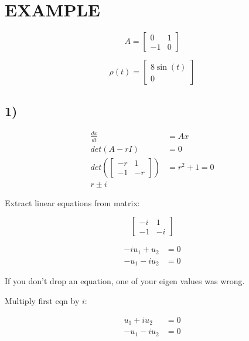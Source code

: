 \documentclass[twocolumn,draft]{article}
\begin{document}
  \section*{EXAMPLE}
  
  \begin{equation}
  	A = \begin{bmatrix}
	0 & 1 \\
	-1 & 0
  	\end{bmatrix}
  \end{equation}
  
  \begin{equation}
  	\rho(t) = \begin{bmatrix}
	8\sin{(t)} \\
	0
  	\end{bmatrix}
  \end{equation}
  
  \subsection*{1)}
  
  \begin{align*}
  	\frac{dx}{dt} &= Ax \\
	det(A-rI) &= 0 \\
	det(\begin{bmatrix}
		-r & 1 \\
		-1 & -r
	\end{bmatrix}) &= r^{2} + 1 = 0 \\
	r \pm i
  \end{align*}
  
  Extract linear equations from matrix:
  
  \begin{equation}
  	\begin{bmatrix}
		-i & 1 \\
		-1 & -i
  	\end{bmatrix}
  \end{equation}
  
  \begin{align*}
	  -iu_{1} + u_{2} &= 0 \\
	  -u_{1} - iu_{2} &= 0
  \end{align*}
  
  If you don't drop an equation, one of your eigen values was wrong.
  
  Multiply first eqn by $i$:
  
  \begin{align*}
	  u_{1} + iu_{2} &= 0 \\
	  -u_{1} - iu_{2} &= 0
  \end{align*}
  
\end{document}
